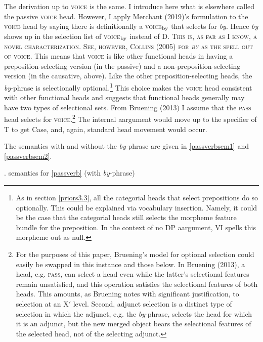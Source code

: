 \documentclass[12pt]{article}
\newcommand*{\textsub}[1]{\ensuremath{_\textrm{{\scriptsize #1}}}}
\begin{document}
\noindent The derivation up to \textsc{voice} is the same. I introduce here what is elsewhere called the passive \textsc{voice} head. However, I apply Merchant (2019)'s formulation to the \textsc{voice} head by saying there is definitionally a \textsc{voice}\textsub{by} that selects for \textit{by}. Hence \textit{by} shows up in the selection list of \textsc{voice}\textsub{by} instead of D.\textsc{ This is, as far as I know, a novel characterization. See, however, Collins (2005) for \textit{by} as the spell out of \textsc{voice}.} This means that \textsc{voice} is like other functional heads in having a preposition-selecting version (in the passive) and a non-preposition-selecting version (in the causative, above). Like the other preposition-selecting heads, the \textit{by}-phrase is selectionally optional.\footnote{ As in section \ref{priors3.3}, all the categorial heads that select prepositions do so optionally. This could be explained via vocabulary insertion. Namely, it could be the case that the categorial heads still selects the morpheme feature bundle for the preposition. In the context of no DP aargument, VI spells this morpheme out as null.} This choice makes the \textsc{voice} head consistent with other functional heads and suggests that functional heads generally may have two types of selectional sets. From Bruening (2013) I assume that the \textsc{pass} head selects for \textsc{voice}.\footnote{For the purposes of this paper, Bruening's model for optional selection could easily be swapped in this instance and those below. In Bruening (2013), a head, e.g. \textsc{pass}, can select a head even while the latter's selectional features remain unsatisfied, and this operation satisfies the selectional features of both heads. This amounts, as Bruening notes with significant justification, to selection at an X$'$ level. Second, adjunct selection is a distinct type of selection in which the adjunct, e.g. the \textit{by}-phrase, selects the head for which it is an adjunct, but the new merged object bears the selectional features of the selected head, not of the selecting adjunct.} The internal aargument would move up to the specifier of T to get Case, and, again, standard head movement would occur.

The semantics with and without the \textit{by}-phrase are given in \ref{passverbsem1} and \ref{passverbsem2}.

\singlespacing
\ex. \label{passverbsem1} semantics for \ref{passverb} (with \textit{by}-phrase)
\end{document}
